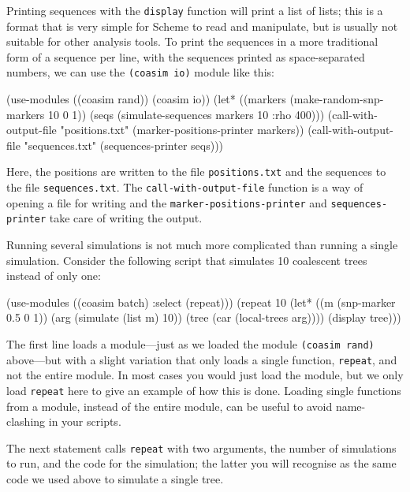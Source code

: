 \documentclass{manual}
\begin{document}
Printing sequences with the \texttt{display} function will print a
list of lists; this is a format that is very simple for Scheme to read
and manipulate, but is usually not suitable for other analysis tools.
To print the sequences in a more traditional form of a sequence per
line, with the sequences printed as space-separated numbers, we can
use the \texttt{(coasim io)} module like this:
\begin{code}
(use-modules ((coasim rand)) (coasim io))
(let* ((markers (make-random-snp-markers 10 0 1))
       (seqs (simulate-sequences markers 10 :rho 400)))
  (call-with-output-file "positions.txt" 
    (marker-positions-printer markers))
  (call-with-output-file "sequences.txt"     
    (sequences-printer seqs)))
\end{code}
Here, the positions are written to the file \texttt{positions.txt} and
the sequences to the file \texttt{sequences.txt}.  The
\texttt{call-with-output-file} function is a way of opening a file for
writing and the \texttt{marker-positions-printer} and
\texttt{sequences-printer} take care of writing the output.

Running several simulations is not much more complicated than running
a single simulation.  Consider the following script that simulates 10
coalescent trees instead of only one:
\begin{code}
(use-modules ((coasim batch) :select (repeat)))
(repeat 10 (let* ((m (snp-marker 0.5 0 1))
                  (arg (simulate (list m) 10))
                  (tree (car (local-trees arg))))
             (display tree)))
\end{code}

The first line loads a module---just as we loaded the module
\texttt{(coasim rand)} above---but with a slight variation that only
loads a single function, \texttt{repeat}, and not the entire module.
In most cases you would just load the module, but we only load
\texttt{repeat} here to give an example of how this is done.  Loading
single functions from a module, instead of the entire module, can be
useful to avoid name-clashing in your scripts.

The next statement calls \texttt{repeat} with two arguments, the
number of simulations to run, and the code for the simulation; the
latter you will recognise as the same code we used above to simulate a
single tree.
\end{document}
